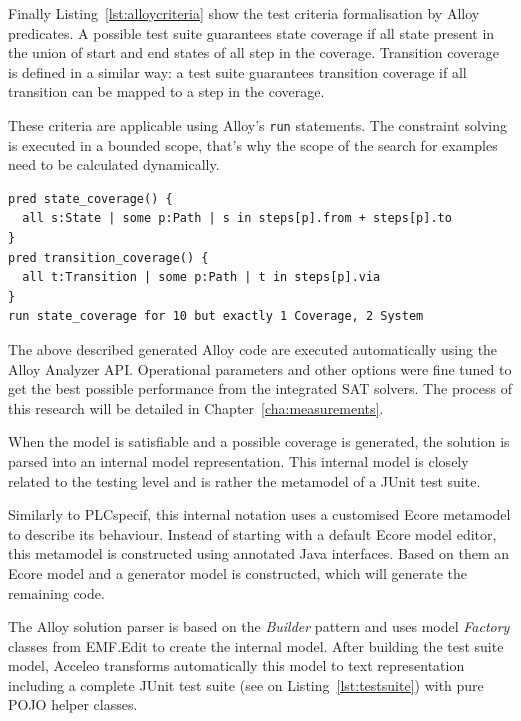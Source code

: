 Finally Listing~\ref{lst:alloycriteria} show the test criteria formalisation by Alloy predicates. A possible test suite guarantees state coverage if all state present in the union of start and end states of all step in the coverage. Transition coverage is defined in a similar way: a test suite guarantees transition coverage if all transition can be mapped to a step in the coverage.

These criteria are applicable using Alloy's \texttt{run} statements. The constraint solving is executed in a bounded scope, that's why the scope of the search for examples need to be calculated dynamically.

\begin{lstlisting}[label={lst:alloycriteria}, caption=Formalising criteria with Alloy,breaklines=true]
pred state_coverage() {
  all s:State | some p:Path | s in steps[p].from + steps[p].to
}
pred transition_coverage() {
  all t:Transition | some p:Path | t in steps[p].via
}
run state_coverage for 10 but exactly 1 Coverage, 2 System
\end{lstlisting}

The above described generated Alloy code are executed automatically using the Alloy Analyzer API. Operational parameters and other options were fine tuned to get the best possible performance from the integrated SAT solvers. The process of this research will be detailed in Chapter~\ref{cha:measurements}.

When the model is satisfiable and a possible coverage is generated, the solution is parsed into an internal model representation. This internal model is closely related to the testing level and is rather the metamodel of a JUnit test suite.

Similarly to PLCspecif, this internal notation uses a customised Ecore metamodel to describe its behaviour. Instead of starting with a default Ecore model editor, this metamodel is constructed using annotated Java interfaces. Based on them an Ecore model and a generator model is constructed, which will generate the remaining code.

The Alloy solution parser is based on the \textit{Builder} pattern \cite{designpatterns} and uses model \textit{Factory} classes from EMF.Edit to create the internal model. After building the test suite model, Acceleo transforms automatically this model to text representation including a complete JUnit test suite (see on Listing~\ref{lst:testsuite}) with pure POJO helper classes.

